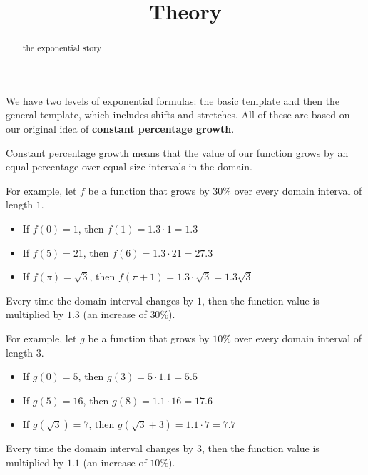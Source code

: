 \documentclass{ximera}
\title{Theory}
\begin{document}
\begin{abstract}
the exponential story
\end{abstract}
\maketitle





We have two levels of exponential formulas: the basic template and then the general template, which includes shifts and stretches.  All of these are based on our original idea of \textbf{\textcolor{purple!85!blue}{constant percentage growth}}.


Constant percentage growth means that the value  of our function grows by an equal percentage over equal size intervals in the domain.



For example, let $f$ be a function that grows by $30\%$ over every domain interval of length $1$. \\


\begin{itemize}
\item If $f(0) = 1$, then $f(1) = 1.3 \cdot 1 = 1.3$
\item If $f(5) = 21$, then $f(6) = 1.3 \cdot 21 = 27.3$
\item If $f(\pi) = \sqrt{3}$, then $f(\pi + 1) = 1.3 \cdot \sqrt{3} = 1.3 \sqrt{3}$
\end{itemize}

Every time the domain interval changes by $1$, then the function value is multiplied by $1.3$ (an increase of $30\%$).






For example, let $g$ be a function that grows by $10\%$ over every domain interval of length $3$. \\


\begin{itemize}
\item If $g(0) = 5$, then $g(3) = 5 \cdot 1.1 = 5.5$
\item If $g(5) = 16$, then $g(8) = 1.1 \cdot 16 = 17.6$
\item If $g(\sqrt{3}) = 7$, then $g(\sqrt{3} + 3) = 1.1 \cdot 7 = 7.7$
\end{itemize}

Every time the domain interval changes by $3$, then the function value is multiplied by $1.1$ (an increase of $10\%$).
\end{document}
